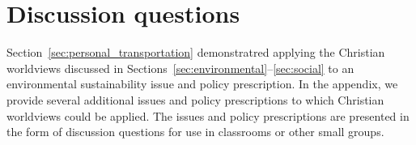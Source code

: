 \documentclass[12pt]{article}
\begin{document}
\section{Discussion questions}
\label{sec:discussion_questions}

Section~\ref{sec:personal_transportation} demonstratred applying 
the Christian worldviews discussed in Sections~\ref{sec:environmental}--\ref{sec:social}
to an environmental sustainability issue and policy prescription.
In the appendix, we provide several additional issues and policy prescriptions 
to which Christian worldviews could be applied.
The issues and policy prescriptions are presented in the form of discussion questions
for use in classrooms or other small groups.
%
\end{document}
